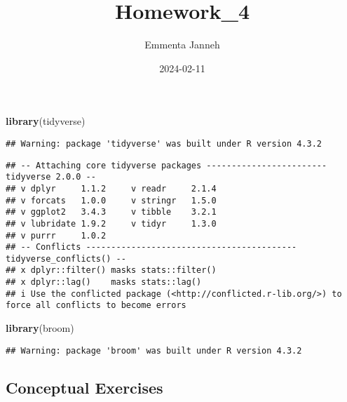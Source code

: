 \documentclass[
]{article}
\title{Homework\_4}
\author{Emmenta Janneh}
\date{2024-02-11}
\newenvironment{Shaded}{\begin{snugshade}}{\end{snugshade}}
\newcommand{\FunctionTok}[1]{\textcolor[rgb]{0.13,0.29,0.53}{\textbf{#1}}}
\newcommand{\NormalTok}[1]{#1}
\begin{document}
\maketitle

\begin{Shaded}
\begin{Highlighting}[]
\FunctionTok{library}\NormalTok{(tidyverse)}
\end{Highlighting}
\end{Shaded}

\begin{verbatim}
## Warning: package 'tidyverse' was built under R version 4.3.2
\end{verbatim}

\begin{verbatim}
## -- Attaching core tidyverse packages ------------------------ tidyverse 2.0.0 --
## v dplyr     1.1.2     v readr     2.1.4
## v forcats   1.0.0     v stringr   1.5.0
## v ggplot2   3.4.3     v tibble    3.2.1
## v lubridate 1.9.2     v tidyr     1.3.0
## v purrr     1.0.2     
## -- Conflicts ------------------------------------------ tidyverse_conflicts() --
## x dplyr::filter() masks stats::filter()
## x dplyr::lag()    masks stats::lag()
## i Use the conflicted package (<http://conflicted.r-lib.org/>) to force all conflicts to become errors
\end{verbatim}

\begin{Shaded}
\begin{Highlighting}[]
\FunctionTok{library}\NormalTok{(broom)}
\end{Highlighting}
\end{Shaded}

\begin{verbatim}
## Warning: package 'broom' was built under R version 4.3.2
\end{verbatim}

\hypertarget{conceptual-exercises}{%
\subsection{Conceptual Exercises}\label{conceptual-exercises}}
\end{document}
